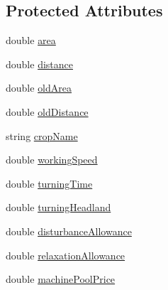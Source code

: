 \subsection*{Protected Attributes}
\begin{DoxyCompactItemize}
\item 
double \hyperlink{classfield_operation_tech_a4577ac12831e5d317301920b7e26de69}{area}
\item 
double \hyperlink{classfield_operation_tech_a632ea22d4eb656dc9a2e44a2e5b0864c}{distance}
\item 
double \hyperlink{classfield_operation_tech_a3ef8f98df6df78861bce7bd026575820}{oldArea}
\item 
double \hyperlink{classfield_operation_tech_abd718cb5d60f2a2034b4fbc53f54b3db}{oldDistance}
\item 
string \hyperlink{classfield_operation_tech_ab89a76987f03b1e7ae02d7ecca19c944}{cropName}
\item 
double \hyperlink{classfield_operation_tech_a644ed10b38595f50750e1a2da1aa3447}{workingSpeed}
\item 
double \hyperlink{classfield_operation_tech_aa0bcc31af0160f8615ff3c8b1d24c8c7}{turningTime}
\item 
double \hyperlink{classfield_operation_tech_a071eaea7399b6fc4e405735bf5b5ed0a}{turningHeadland}
\item 
double \hyperlink{classfield_operation_tech_a8d8b0c38c97ad38b9b3a595e4faf6a1f}{disturbanceAllowance}
\item 
double \hyperlink{classfield_operation_tech_ae917aae3110936d50cbd7ed3ea7c9ae1}{relaxationAllowance}
\item 
double \hyperlink{classfield_operation_tech_ac23c94553226b6c0d71dbe09485e8989}{machinePoolPrice}
\end{DoxyCompactItemize}


